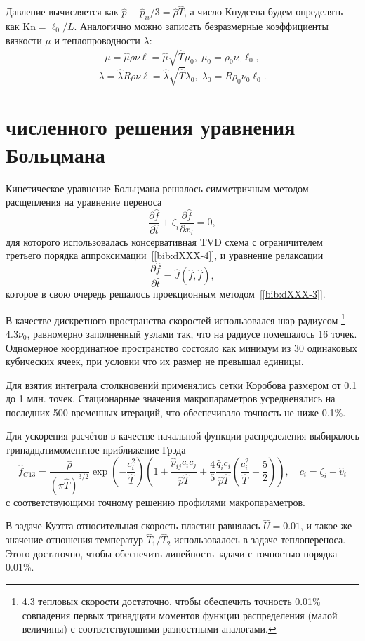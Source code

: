 \documentclass[english,russian,a4paper,12pt]{article}
\newcommand{\Kn}{\mathrm{Kn}}
\begin{document}
Давление вычисляется как \(\hat{p} \equiv \hat{p}_{ii}/3 = \hat{\rho}\hat{T}\), а число Кнудсена будем определять как \(\Kn=\ell_0/L\).
Аналогично можно записать безразмерные коэффициенты вязкости \(\mu\) и теплопроводности \(\lambda\):
\[ \mu = \hat{\mu}\rho\nu\ell = \hat{\mu}\sqrt{\hat{T}}\mu_0, \; \mu_0 = \rho_0\nu_0\ell_0, \]
\[ \lambda = \hat{\lambda}R\rho\nu\ell = \hat{\lambda}\sqrt{\hat{T}}\lambda_0, \; \lambda_0 = R\rho_0\nu_0\ell_0. \]
 
\section*{ численного решения уравнения Больцмана}

Кинетическое уравнение Больцмана решалось симметричным методом расщепления на уравнение переноса
\[ \frac{\partial\hat{f}}{\partial\hat{t}} + \zeta_i\frac{\partial\hat{f}}{\partial x_i} = 0, \]
для которого использовалась консервативная TVD схема с ограничителем третьего порядка аппроксимации~[\ref{bib:dXXX-4}],
и уравнение релаксации
\[ \frac{\partial\hat{f}}{\partial\hat{t}} = \hat{J}(\hat{f},\hat{f}), \]
которое в свою очередь решалось проекционным методом~[\ref{bib:dXXX-3}].

В качестве дискретного пространства скоростей использовался шар радиусом \footnote
{
	4.3 тепловых скорости достаточно, чтобы обеспечить точность 0.01\% совпадения
	первых тринадцати моментов функции распределения (малой величины) с соответствующими разностными аналогами.
}\(4.3\nu_0\),
равномерно заполненный узлами так, что на радиусе помещалось 16 точек.
Одномерное координатное пространство состояло как минимум из 30 одинаковых кубических ячеек,
при условии что их размер не превышал единицы.

Для взятия интеграла столкновений применялись сетки Коробова размером от 0.1 до 1 млн. точек.
Стационарные значения макропараметров усредненялись на последних 500 временных итераций,
что обеспечивало точность не ниже 0.1\%.

Для ускорения расчётов в качестве начальной функции распределения выбиралось тринадцатимоментное приближение Грэда
\[ 
	\hat{f}_{G13} = \frac{\hat\rho}{(\pi\hat T)^{3/2}}\exp\left(-\frac{c_i^2}{\hat T}\right)
	\left( 1+\frac{\hat p_{ij}c_ic_j}{\hat p\hat T} + \frac4{5}\frac{\hat q_ic_i}{\hat p\hat T}\left(\frac{c_i^2}{\hat T}-\frac5{2}\right) \right),
	\quad c_i = \zeta_i - \hat v_i
\]
с соответствующими точному решению профилями макропараметров.

В задаче Куэтта относительная скорость пластин равнялась \(\hat{U}=0.01\),
и такое же значение отношения температур \(\hat{T}_1/\hat{T}_2\) использовалось в задаче теплопереноса.
Этого достаточно, чтобы обеспечить линейность задачи с точностью порядка 0.01\%.
\end{document}

